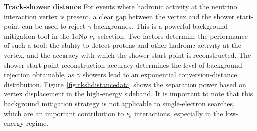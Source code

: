 \par \textbf{Track-shower distance} For events where hadronic activity at the neutrino interaction vertex is present, a clear gap between the vertex and the shower start-point can be used to reject $\gamma$ backgrounds. This is a powerful background mitigation tool in the 1$e$N$p$ $\nu_e$ selection. Two factors determine the performance of such a tool: the ability to detect protons and other hadronic activity at the vertex, and the accuracy with which the shower start-point is reconstructed. The shower start-point reconstruction accuracy determines the level of background rejection obtainable, as $\gamma$ showers lead to an exponential conversion-distance distribution. Figure~\ref{fig:tkshdistancedata} shows the separation power based on vertex displacement in the high-energy sideband. It is important to note that this background mitigation strategy is not applicable to single-electron searches, which are an important contribution to $\nu_e$ interactions, especially in the low-energy regime.

